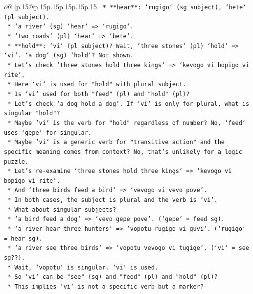 \documentclass{article}
\begin{document}
{\begin{supertabular}{c@{$\;$}|p{.15\linewidth}@{}p{.15\linewidth}p{.15\linewidth}p{.15\linewidth}p{.15\linewidth}p{.15\linewidth}}
{{{\texttt{    *   **hear**: `rugigo` (sg subject), `bete` (pl subject).} \\
\texttt{        *   `a river` (sg) `hear` => `rugigo`.} \\
\texttt{        *   `two roads` (pl) `hear` => `bete`.} \\
\texttt{    *   **hold**: `vi` (pl subject)? Wait, `three stones` (pl) `hold` => `vi`. `a dog` (sg) `hold`? Not shown.} \\
\texttt{        *   Let's check `three stones hold three kings` => `kevogo vi bopigo vi rite`.} \\
\texttt{        *   Here `vi` is used for "hold" with plural subject.} \\
\texttt{        *   Is `vi` used for both "feed" (pl) and "hold" (pl)?} \\
\texttt{        *   Let's check `a dog hold a dog`. If `vi` is only for plural, what is singular "hold"?} \\
\texttt{        *   Maybe `vi` is the verb for "hold" regardless of number? No, `feed` uses `gepe` for singular.} \\
\texttt{        *   Maybe `vi` is a generic verb for "transitive action" and the specific meaning comes from context? No, that's unlikely for a logic puzzle.} \\
\texttt{        *   Let's re{-}examine `three stones hold three kings` => `kevogo vi bopigo vi rite`.} \\
\texttt{        *   And `three birds feed a bird` => `vevogo vi vevo pove`.} \\
\texttt{        *   In both cases, the subject is plural and the verb is `vi`.} \\
\texttt{        *   What about singular subjects?} \\
\texttt{            *   `a bird feed a dog` => `vevo gepe pove`. (`gepe` = feed sg).} \\
\texttt{            *   `a river hear three hunters` => `vopotu rugigo vi guvi`. (`rugigo` = hear sg).} \\
\texttt{            *   `a river see three birds` => `vopotu vevogo vi tugige`. (`vi` = see sg??).} \\
\texttt{                *   Wait, `vopotu` is singular. `vi` is used.} \\
\texttt{                *   So `vi` can be "see" (sg) and "feed" (pl) and "hold" (pl)?} \\
\texttt{                *   This implies `vi` is not a specific verb but a marker?} \\
}}}
\end{supertabular}}
\end{document}
